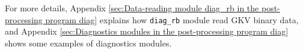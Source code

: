 For more details, Appendix \ref{sec:Data-reading module diag_rb in the post-processing program diag} explains how \texttt{diag\_rb} module read GKV binary data, and Appendix \ref{sec:Diagnostics modules in the post-processing program diag} shows some examples of diagnostics modules.




